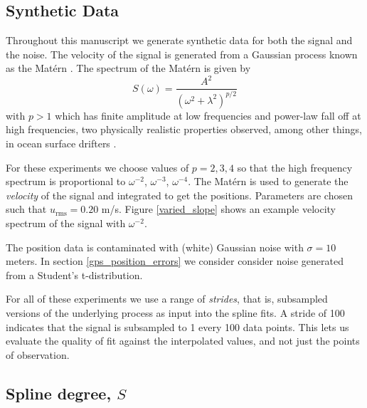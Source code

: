 \documentclass[10pt,journal]{IEEEtran}
\begin{document}
\subsection{Synthetic Data} \label{sec:synthetic_data}

Throughout this manuscript we generate synthetic data for both the signal and the noise. The velocity of the signal is generated from a Gaussian process known as the Mat\'ern \cite{lilly2017-npg}. The spectrum of the Mat\'ern is given by
\begin{equation}
S(\omega) = \frac{A^2}{(\omega^2 + \lambda^2)^{p/2}}
\end{equation}
with $p>1$ which has finite amplitude at low frequencies and power-law fall off at high frequencies, two physically realistic properties observed, among other things, in ocean surface drifters \cite{sykulski2016-jrssc}.


For these experiments we choose values of $p=2,3,4$ so that the high frequency spectrum is proportional to $\omega^{-2}$, $\omega^{-3}$, $\omega^{-4}$. The Mat\'ern is used to generate the \emph{velocity} of the signal and integrated to get the positions. Parameters are chosen such that $u_{\textrm{rms}}=0.20$ m/s. Figure \ref{varied_slope} shows an example velocity spectrum of the signal with $\omega^{-2}$.

The position data is contaminated with (white) Gaussian noise with $\sigma=10$ meters. In section \ref{gps_position_errors} we consider consider noise generated from a Student's t-distribution.

For all of these experiments we use a range of \emph{strides}, that is, subsampled versions of the underlying process as input into the spline fits. A stride of 100 indicates that the signal is subsampled to 1 every 100 data points. This lets us evaluate the quality of fit against the interpolated values, and not just the points of observation.

\subsection{Spline degree, $S$} \label{spline_degree}
\end{document}
